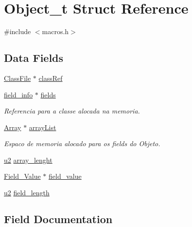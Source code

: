 \hypertarget{struct_object__t}{}\section{Object\+\_\+t Struct Reference}
\label{struct_object__t}


{\ttfamily \#include $<$macros.\+h$>$}

\subsection*{Data Fields}
\begin{DoxyCompactItemize}
\item 
\hyperlink{struct_class_file}{Class\+File} $\ast$ \hyperlink{struct_object__t_a2b2f7cc877adf1320a6bfa83a3c7696b}{class\+Ref}
\item 
\hyperlink{structfield__info}{field\+\_\+info} $\ast$ \hyperlink{struct_object__t_ae01d16d1ab715a4f5dd1fe8254322594}{fields}
\begin{DoxyCompactList}\small\item\em Referencia para a classe alocada na memoria. \end{DoxyCompactList}\item 
\hyperlink{macros_8h_aac5c75e0951ba540830fb40be439f205}{Array} $\ast$ \hyperlink{struct_object__t_a11a8bef303b6cb29d8f81e367516e8b8}{array\+List}
\begin{DoxyCompactList}\small\item\em Espaco de memoria alocado para os fields do Objeto. \end{DoxyCompactList}\item 
\hyperlink{macros_8h_a732cde1300aafb73b0ea6c2558a7a54f}{u2} \hyperlink{struct_object__t_ae05c8fe9c6252af97d298b2a2cd87e6c}{array\+\_\+lenght}
\item 
\hyperlink{struct_field___value}{Field\+\_\+\+Value} $\ast$ \hyperlink{struct_object__t_abc71e19d88c36d73f0489da678932851}{field\+\_\+value}
\item 
\hyperlink{macros_8h_a732cde1300aafb73b0ea6c2558a7a54f}{u2} \hyperlink{struct_object__t_a5883165e105ef5c03879572a89675ca0}{field\+\_\+length}
\end{DoxyCompactItemize}


\subsection{Field Documentation}
\hypertarget{struct_object__t_ae05c8fe9c6252af97d298b2a2cd87e6c}{}
